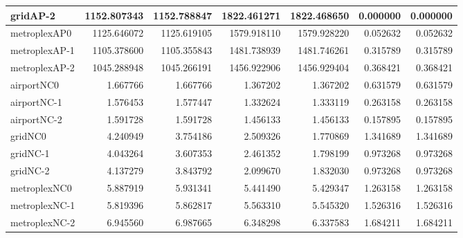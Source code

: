 \begin{longtable}{|l|r|r|r|r|r|r|}
gridAP-2 & 1152.807343 & 1152.788847 & 1822.461271 & 1822.468650 & 0.000000 & 0.000000 \\ \hline
metroplexAP0 & 1125.646072 & 1125.619105 & 1579.918110 & 1579.928220 & 0.052632 & 0.052632 \\ \hline
metroplexAP-1 & 1105.378600 & 1105.355843 & 1481.738939 & 1481.746261 & 0.315789 & 0.315789 \\ \hline
metroplexAP-2 & 1045.288948 & 1045.266191 & 1456.922906 & 1456.929404 & 0.368421 & 0.368421 \\ \hline
airportNC0 & 1.667766 & 1.667766 & 1.367202 & 1.367202 & 0.631579 & 0.631579 \\ \hline
airportNC-1 & 1.576453 & 1.577447 & 1.332624 & 1.333119 & 0.263158 & 0.263158 \\ \hline
airportNC-2 & 1.591728 & 1.591728 & 1.456133 & 1.456133 & 0.157895 & 0.157895 \\ \hline
gridNC0 & 4.240949 & 3.754186 & 2.509326 & 1.770869 & 1.341689 & 1.341689 \\ \hline
gridNC-1 & 4.043264 & 3.607353 & 2.461352 & 1.798199 & 0.973268 & 0.973268 \\ \hline
gridNC-2 & 4.137279 & 3.843792 & 2.099670 & 1.832030 & 0.973268 & 0.973268 \\ \hline
metroplexNC0 & 5.887919 & 5.931341 & 5.441490 & 5.429347 & 1.263158 & 1.263158 \\ \hline
metroplexNC-1 & 5.819396 & 5.862817 & 5.563310 & 5.545320 & 1.526316 & 1.526316 \\ \hline
metroplexNC-2 & 6.945560 & 6.987665 & 6.348298 & 6.337583 & 1.684211 & 1.684211 \\ \hline
\end{longtable}
